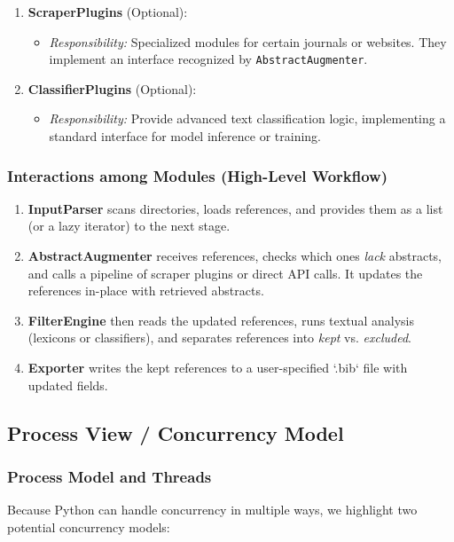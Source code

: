 \documentclass[12pt]{article}
\begin{document}
\begin{enumerate}[label=\alph*)]
  \item \textbf{ScraperPlugins} (Optional):
  \begin{itemize}
    \item \emph{Responsibility:} Specialized modules for certain journals or websites. They implement an interface recognized by \texttt{AbstractAugmenter}.
  \end{itemize}

  \item \textbf{ClassifierPlugins} (Optional):
  \begin{itemize}
    \item \emph{Responsibility:} Provide advanced text classification logic, implementing a standard interface for model inference or training.
  \end{itemize}
\end{enumerate}

\subsubsection{Interactions among Modules (High-Level Workflow)}
\begin{enumerate}
  \item \textbf{InputParser} scans directories, loads references, and provides them as a list (or a lazy iterator) to the next stage.
  \item \textbf{AbstractAugmenter} receives references, checks which ones \emph{lack} abstracts, and calls a pipeline of scraper plugins or direct API calls. It updates the references in-place with retrieved abstracts.
  \item \textbf{FilterEngine} then reads the updated references, runs textual analysis (lexicons or classifiers), and separates references into \emph{kept} vs. \emph{excluded}. 
  \item \textbf{Exporter} writes the kept references to a user-specified `.bib` file with updated fields.
\end{enumerate}

\subsection{Process View / Concurrency Model}
\label{sec:process-view}

\subsubsection{Process Model and Threads}
Because Python can handle concurrency in multiple ways, we highlight two potential concurrency models:
\end{document}
